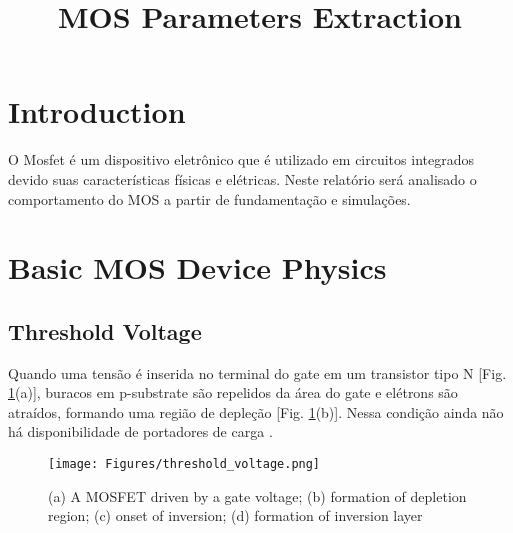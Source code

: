 \documentclass[10pt, conference,a4paper]{IEEEtran}
\begin{document}
%
\title{	MOS Parameters Extraction \\  

\vspace{0.3\baselineskip} \Large{}} %

\author{ 
}

\maketitle













\section{Introduction}
O Mosfet é um dispositivo eletrônico que é utilizado em circuitos integrados devido suas características físicas e elétricas. Neste relatório será analisado o comportamento do MOS a partir de fundamentação e simulações.




\section{Basic MOS Device Physics}

\subsection{Threshold Voltage}
Quando uma tensão é inserida no terminal do gate em um transistor tipo N [Fig. \ref{fig:Threshold}(a)], buracos em p-substrate são repelidos da área do gate e elétrons são atraídos, formando uma região de depleção [Fig. \ref{fig:Threshold}(b)]. Nessa condição ainda não há disponibilidade de portadores de carga \cite{razavi2005design}. 

\begin{figure}[h]
    \centering
    \texttt{[image: Figures/threshold\_voltage.png]}
    \caption{(a) A MOSFET driven by a gate voltage; (b) formation of depletion region; (c) onset of inversion; (d) formation of inversion layer}
    \label{fig:Threshold}
\end{figure}
\end{document}
